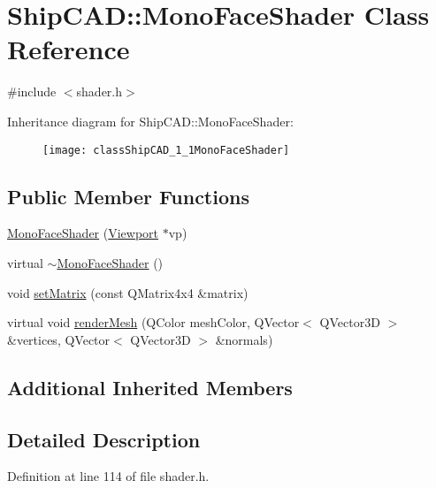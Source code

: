\hypertarget{classShipCAD_1_1MonoFaceShader}{}\section{Ship\+C\+AD\+:\+:Mono\+Face\+Shader Class Reference}
\label{classShipCAD_1_1MonoFaceShader}


{\ttfamily \#include $<$shader.\+h$>$}

Inheritance diagram for Ship\+C\+AD\+:\+:Mono\+Face\+Shader\+:\begin{figure}[H]
\begin{center}
\leavevmode
\texttt{[image: classShipCAD\_1\_1MonoFaceShader]}
\end{center}
\end{figure}
\subsection*{Public Member Functions}
\begin{DoxyCompactItemize}
\item 
\hyperlink{classShipCAD_1_1MonoFaceShader_a963aa389c930d6482a58f49b2ccb4473}{Mono\+Face\+Shader} (\hyperlink{classShipCAD_1_1Viewport}{Viewport} $\ast$vp)
\item 
virtual \hyperlink{classShipCAD_1_1MonoFaceShader_ab1f3cb853a5a2b04f9c4944d9eca30b4}{$\sim$\+Mono\+Face\+Shader} ()
\item 
void \hyperlink{classShipCAD_1_1MonoFaceShader_a9fee4d776ac7604b35b868c2a4421d92}{set\+Matrix} (const Q\+Matrix4x4 \&matrix)
\item 
virtual void \hyperlink{classShipCAD_1_1MonoFaceShader_a9a358ec63af4b067449e772cbc735d5a}{render\+Mesh} (Q\+Color mesh\+Color, Q\+Vector$<$ Q\+Vector3D $>$ \&vertices, Q\+Vector$<$ Q\+Vector3D $>$ \&normals)
\end{DoxyCompactItemize}
\subsection*{Additional Inherited Members}


\subsection{Detailed Description}


Definition at line 114 of file shader.\+h.



